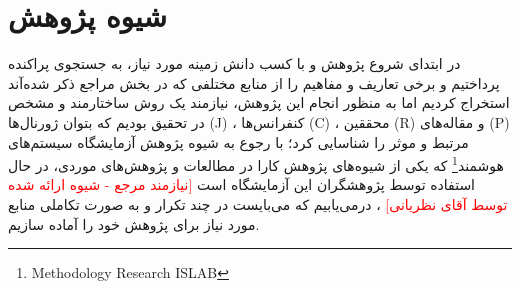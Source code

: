 \documentclass{article}
\theoremstyle{definition}
\begin{document}
\section{شیوه پژوهش}
در ابتدای شروع پژوهش و با کسب دانش ‌زمینه مورد نیاز، به جستجوی پراکنده پرداختیم و برخی تعاریف و مفاهیم را از منابع مختلفی که در بخش مراجع ذکر شده‌آند استخراج کردیم اما به منظور انجام این پژوهش، نیازمند یک روش ساختارمند و مشخص در تحقیق بودیم که بتوان ژورنال‌ها (J) ، کنفرانس‌ها (C) ، محققین‌ (R) و مقاله‌های (P) مرتبط و موثر را شناسایی کرد؛ با رجوع به شیوه پژوهش آزمایشگاه سیستم‌های هوشمند\footnote{Methodology Research ISLAB}
که یکی از  شیوه‌های پژوهش کارا در مطالعات و پژوهش‌های موردی، در حال استفاده توسط پژوهشگران این آزمایشگاه است
 \textcolor{red}{[نیازمند مرجع - شیوه ارائه شده توسط آقای نظریانی]}
 \textcolor{black}{}،
درمی‌یابیم که می‌بایست در چند تکرار و به صورت تکاملی منابع مورد نیاز برای پژوهش خود را آماده سازیم.
\end{document}

